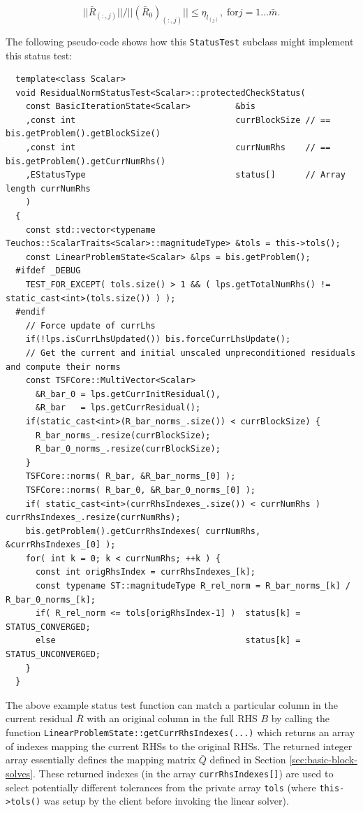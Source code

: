 \documentclass[pdf,ps2pdf,11pt]{SANDreport}
\begin{document}
\begin{enumerate}
\[
||\bar{R}_{(:,j)}|| / ||(\bar{R}_0)_{(:,j)}|| \leq \eta_{l_{(j)}}, \;
\mbox{for} j = 1 \ldots \bar{m}.
\]

The following pseudo-code shows how this {}\texttt{Status\-Test}
subclass might implement this status test:

{\scriptsize\begin{verbatim}
  template<class Scalar>
  void ResidualNormStatusTest<Scalar>::protectedCheckStatus(
    const BasicIterationState<Scalar>         &bis
    ,const int                                currBlockSize // == bis.getProblem().getBlockSize()
    ,const int                                currNumRhs    // == bis.getProblem().getCurrNumRhs()
    ,EStatusType                              status[]      // Array length currNumRhs
    )
  {
    const std::vector<typename Teuchos::ScalarTraits<Scalar>::magnitudeType> &tols = this->tols();
    const LinearProblemState<Scalar> &lps = bis.getProblem();
  #ifdef _DEBUG
    TEST_FOR_EXCEPT( tols.size() > 1 && ( lps.getTotalNumRhs() != static_cast<int>(tols.size()) ) );
  #endif
    // Force update of currLhs
    if(!lps.isCurrLhsUpdated()) bis.forceCurrLhsUpdate();  
    // Get the current and initial unscaled unpreconditioned residuals and compute their norms
    const TSFCore::MultiVector<Scalar>
      &R_bar_0 = lps.getCurrInitResidual(),
      &R_bar   = lps.getCurrResidual();
    if(static_cast<int>(R_bar_norms_.size()) < currBlockSize) {
      R_bar_norms_.resize(currBlockSize);
      R_bar_0_norms_.resize(currBlockSize);
    }
    TSFCore::norms( R_bar, &R_bar_norms_[0] );
    TSFCore::norms( R_bar_0, &R_bar_0_norms_[0] );
    if( static_cast<int>(currRhsIndexes_.size()) < currNumRhs ) currRhsIndexes_.resize(currNumRhs);
    bis.getProblem().getCurrRhsIndexes( currNumRhs, &currRhsIndexes_[0] );
    for( int k = 0; k < currNumRhs; ++k ) {
      const int origRhsIndex = currRhsIndexes_[k];
      const typename ST::magnitudeType R_rel_norm = R_bar_norms_[k] / R_bar_0_norms_[k];
      if( R_rel_norm <= tols[origRhsIndex-1] )  status[k] = STATUS_CONVERGED;
      else                                      status[k] = STATUS_UNCONVERGED;
    }
  }
\end{verbatim}}

The above example status test function can match a particular column
in the current residual $\bar{R}$ with an original column in the full
RHS $B$ by calling the function
{}\texttt{Linear\-Problem\-State::\-get\-Curr\-Rhs\-Indexes(...)}
which returns an array of indexes mapping the current RHSs to the
original RHSs.  The returned integer array essentially defines the
mapping matrix $\bar{Q}$ defined in Section
{}\ref{sec:basic-block-solves}.  These returned indexes (in the array
{}\texttt{currRhsIndexes[]}) are used to select potentially different
tolerances from the private array {}\texttt{tols} (where
{}\texttt{this->tols()} was setup by the client before invoking the
linear solver).


\end{enumerate}
\end{document}
